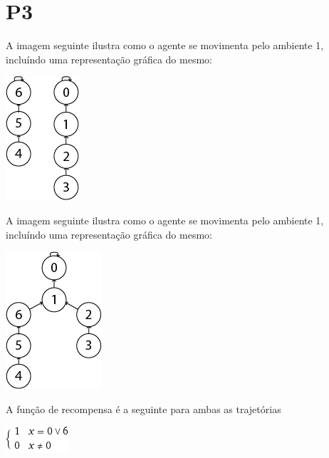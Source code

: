 \documentclass[11pt,twocolumn]{article}
\begin{document}
\section*{P3}

A imagem seguinte ilustra como o agente se movimenta pelo ambiente 1, incluíndo uma representação gráfica do mesmo:

\begin{center}
    \includegraphics[scale=0.4]{Trajetoria1.png}
\end{center}

\par A imagem seguinte ilustra como o agente se movimenta pelo ambiente 1, incluíndo uma representação gráfica do mesmo:



\begin{center}
    \includegraphics[scale=0.4]{Trajetoria2.png}
\end{center}

A função de recompensa é a seguinte para ambas as trajetórias 

\begin{center}
    \includegraphics[scale=0.6]{piece1.png}
\end{center}
\end{document}
